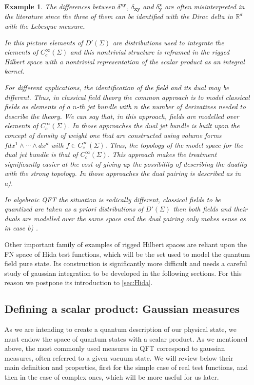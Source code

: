 \documentclass[12pt]{article}%
\newtheorem{example}{Example}%
\begin{document}
\begin{example}
The differences between $\delta^{\mathbf{xy}}$, $\delta_{\mathbf{xy}}$ and $\delta^{\mathbf{x}}_{\mathbf{y}}$ are often misinterpreted in the literature since the three of them can be identified with the Dirac delta in $\mathbb{R}^d$ with the Lebesgue measure. 

In this picture elements of  $D'(\Sigma)$ are distributions used to integrate the elements of $C^\infty_c(\Sigma)$ and this nontrivial structure is reframed in the rigged Hilbert space with a nontrivial representation of the scalar product as an integral kernel.

For different applications, the identification of the field and its dual may be different. Thus, in  classical field theory the common approach \cite{gotayMomentumMapsClassical2004a,gotayMomentumMapsClassical2004} is to model classical fields as elements of a $n$-th jet bundle with $n$ the number of derivatives needed to describe the theory. We can say that, in this approach, fields are modelled over elements of  $C^\infty_c(\Sigma)$. In those approaches the dual jet bundle is built upon the concept of density of weight one  that are constructed using volume forms $f dx^1\wedge \cdots\wedge dx^d$ with $f\in C^\infty_c(\Sigma)$.  Thus, the topology of the model space for the dual jet bundle is that of  $C^\infty_c(\Sigma)$. This approach makes the treatment significantly easier at the cost of giving up the possibility of describing the duality with the strong topology. In those approaches the dual pairing is described as in a).

In algebraic QFT the situation is radically different, classical fields to be quantized are taken as a priori distributions of $D'(\Sigma)$ then both fields and their duals are modelled over the same space and the dual pairing only makes sense as in case b) \cite{Brunetti2015}. 

\end{example}


Other important family of examples of rigged Hilbert spaces are reliant upon the FN space of  Hida test functions, which will be the set used to model the quantum field pure state. Its construction is significantly more difficult and needs a careful study of gaussian integration to be developed in the following sections. For this reason  we postpone its introduction to \autoref{sec:Hida}. 

\subsection{Defining a scalar product: Gaussian measures}
As we are intending to create a quantum description of our physical state, we must endow the space of quantum states with a scalar product.  As we mentioned above, the most commonly used measures in QFT correspond to gaussian measures, often referred to a given vacuum state. 
We will review below their main definition and  properties, first for the simple case of real test functions, and then in the case of complex ones, which will be more useful for us later.
\end{document}
